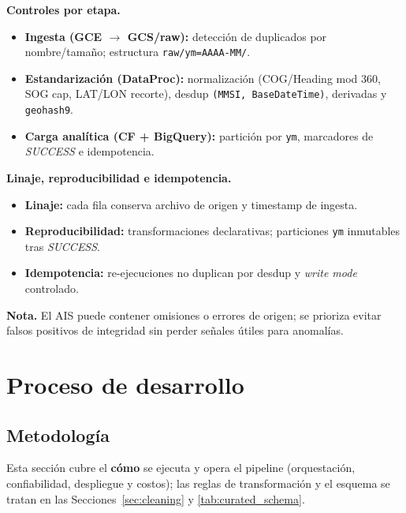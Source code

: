 \documentclass[10pt]{article}
\begin{document}
\vspace{0.2cm}
\noindent\textbf{Controles por etapa.}
\begin{itemize}
  \item \textbf{Ingesta (GCE $\rightarrow$ GCS/raw):} detección de duplicados por nombre/tamaño; estructura \texttt{raw/ym=AAAA-MM/}.
  \item \textbf{Estandarización (DataProc):} normalización (COG/Heading mod 360, SOG cap, LAT/LON recorte), desdup \texttt{(MMSI, BaseDateTime)}, derivadas y \texttt{geohash9}.
  \item \textbf{Carga analítica (CF + BigQuery):} partición por \texttt{ym}, marcadores de \textit{SUCCESS} e idempotencia.
\end{itemize}

\noindent\textbf{Linaje, reproducibilidad e idempotencia.}
\begin{itemize}
  \item \textbf{Linaje:} cada fila conserva archivo de origen y timestamp de ingesta.
  \item \textbf{Reproducibilidad:} transformaciones declarativas; particiones \texttt{ym} inmutables tras \textit{SUCCESS}.
  \item \textbf{Idempotencia:} re-ejecuciones no duplican por desdup y \emph{write mode} controlado.
\end{itemize}

\vspace{0.2cm}
\noindent\textbf{Nota.} El AIS puede contener omisiones o errores de origen; se prioriza evitar falsos positivos de integridad sin perder señales útiles para anomalías.

\section{Proceso de desarrollo}
\subsection{Metodología} 
\label{sec:metodologia}

Esta sección cubre el \textbf{cómo} se ejecuta y opera el pipeline (orquestación, confiabilidad, despliegue y costos); las reglas de transformación y el esquema se tratan en las Secciones~\ref{sec:cleaning} y \ref{tab:curated_schema}.
\end{document}
